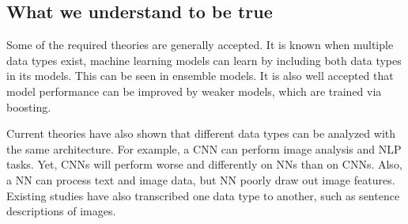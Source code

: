 \subsection{What we understand to be true}

Some of the required theories are generally accepted. It is known when multiple data types exist, machine learning models can learn by including both data types in its models.  This can be seen in ensemble models.  It is also well accepted that model performance can be improved by weaker models, which are trained via boosting.

Current theories have also shown that different data types can be analyzed with the same architecture.  For example, a CNN can perform image analysis and NLP tasks.  Yet, CNNs will perform worse and differently on NNs than on CNNs.  Also, a NN can process text and image data, but NN poorly draw out image features.  Existing studies have also transcribed one data type to another, such as sentence descriptions of images.  
